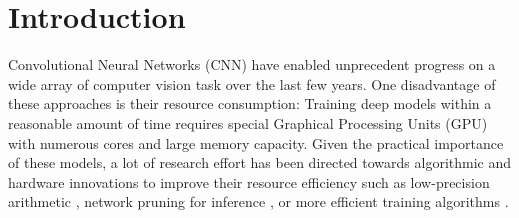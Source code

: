 \documentclass[twocolumn]{bmcart}
\begin{document}
\begin{frontmatter}
\begin{fmbox}
\begin{abstractbox}

\begin{keyword}
\end{keyword}


\end{abstractbox}
\end{fmbox}%
\end{frontmatter}




\section{Introduction}
Convolutional Neural Networks (CNN) have enabled unprecedent progress on a wide array of computer vision task over the last few years.
One disadvantage of these approaches is their resource consumption: 
Training deep models within a reasonable amount of time requires special
Graphical Processing Units (GPU) with numerous cores and large memory capacity.
Given the practical importance of these models, a lot of research effort has been directed
towards algorithmic and hardware innovations to improve their resource efficiency such as low-precision arithmetic \cite{}, network pruning for inference \cite{}, or more efficient training algorithms \cite{}.
\end{document}
